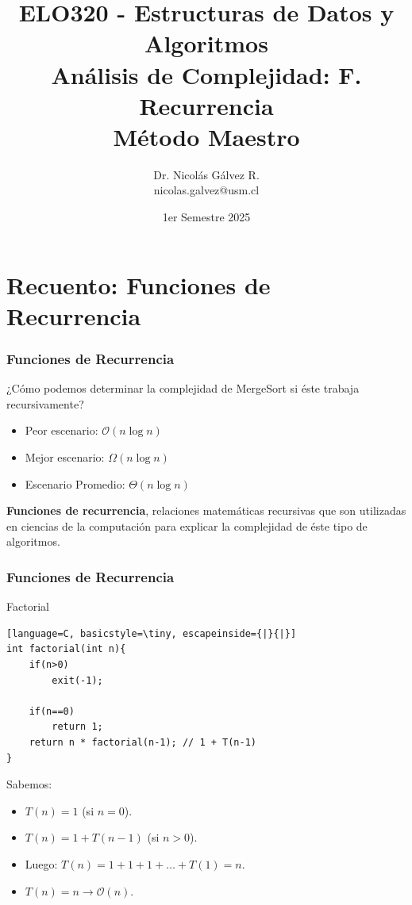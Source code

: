 \documentclass{beamer}
\title{ELO320 - Estructuras de Datos y Algoritmos\\Análisis de Complejidad: F. Recurrencia\\\small{Método Maestro}}
\author{Dr. Nicolás Gálvez R.\\{\small nicolas.galvez@usm.cl}}
\institute{Ing. Civil Telemática - Departamento de Electrónica}
\date{1er Semestre 2025}
\begin{document}
\frame{\titlepage}

%
%

\section{Recuento: Funciones de Recurrencia}
\begin{frame}[fragile]
 \frametitle{Funciones de Recurrencia}
\small
¿Cómo podemos determinar la complejidad de MergeSort si éste trabaja recursivamente?
\begin{itemize}
\item Peor escenario: $\mathcal{O}(n \log n)$
\item Mejor escenario: $\Omega(n \log n)$
\item Escenario Promedio: $\Theta(n \log n)$
\end{itemize}

\textbf{Funciones de recurrencia}, relaciones matemáticas recursivas que son utilizadas en ciencias de la computación para explicar la complejidad de éste tipo de algoritmos.
\end{frame}

\begin{frame}[fragile]
 \frametitle{Funciones de Recurrencia}
\small
\begin{exampleblock}{Factorial}
\begin{lstlisting}[language=C, basicstyle=\tiny, escapeinside={|}{|}]
int factorial(int n){
	if(n>0)
		exit(-1);

	if(n==0)
		return 1;
	return n * factorial(n-1); // 1 + T(n-1)
}
\end{lstlisting}
\end{exampleblock}

Sabemos:
\begin{itemize}
\item $T(n) = 1$ (si $n = 0$).
\item $T(n) = 1 + T(n-1)$ (si $n > 0$).
\item Luego: $T(n) = 1 + 1 + 1 + \dots + T(1) = n$.\pause
\item $T(n) = n \rightarrow \mathcal{O}(n)$.
\end{itemize}
\end{frame}
\end{document}
